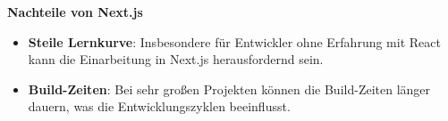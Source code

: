 \textbf{Nachteile von Next.js}
\begin{itemize} \item \textbf{Steile Lernkurve}: Insbesondere für Entwickler ohne Erfahrung mit React kann die Einarbeitung in Next.js herausfordernd sein.\textit{\cite{rathinam2022analysis, shetty2020review}} \item \textbf{Build-Zeiten}: Bei sehr großen Projekten können die Build-Zeiten länger dauern, was die Entwicklungszyklen beeinflusst.\textit{\cite{madurapperuma2022state, rathinam2022analysis}} \end{itemize}


